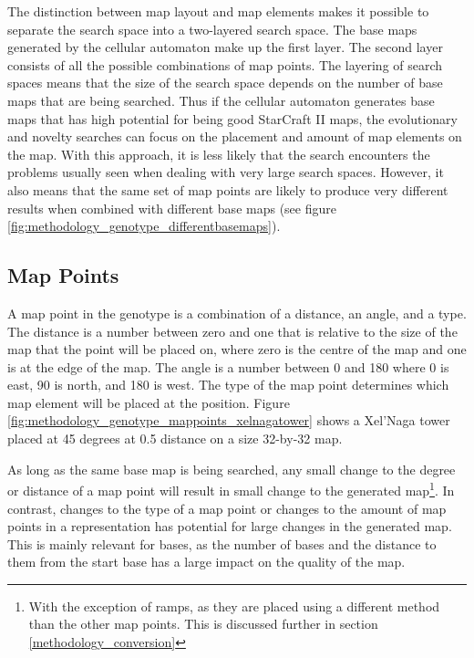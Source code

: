 The distinction between map layout and map elements makes it possible to separate the search space into a two-layered search space. The base maps generated by the cellular automaton make up the first layer. The second layer consists of all the possible combinations of map points. The layering of search spaces means that the size of the search space depends on the number of base maps that are being searched. Thus if the cellular automaton generates base maps that has high potential for being good StarCraft II maps, the evolutionary and novelty searches can focus on the placement and amount of map elements on the map. With this approach, it is less likely that the search encounters the problems usually seen when dealing with very large search spaces. However, it also means that the same set of map points are likely to produce very different results when combined with different base maps (see figure \ref{fig:methodology_genotype_differentbasemaps}).


\subsection{Map Points}
\label{methodology_genotype_mappoints}
A map point in the genotype is a combination of a distance, an angle, and a type. The distance is a number between zero and one that is relative to the size of the map that the point will be placed on, where zero is the centre of the map and one is at the edge of the map. The angle is a number between 0 and 180 where 0 is east, 90 is north, and 180 is west. The type of the map point determines which map element will be placed at the position. Figure \ref{fig:methodology_genotype_mappoints_xelnagatower} shows a Xel'Naga tower placed at 45 degrees at 0.5 distance on a size 32-by-32 map.


As long as the same base map is being searched, any small change to the degree or distance of a map point will result in small change to the generated map\footnote{With the exception of ramps, as they are placed using a different method than the other map points. This is discussed further in section \ref{methodology_conversion}}. In contrast, changes to the type of a map point or changes to the amount of map points in a representation has potential for large changes in the generated map. This is mainly relevant for bases, as the number of bases and the distance to them from the start base has a large impact on the quality of the map.

